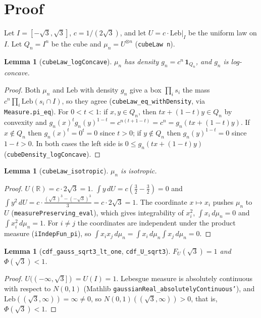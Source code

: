 \documentclass[11pt]{article}
\newtheorem{lemma}[theorem]{Lemma}
\theoremstyle{definition}
\newcommand{\R}{\mathbb{R}}
\begin{document}
\section{Proof}

Let $I=[-\sqrt3,\sqrt3]$, $c=1/(2\sqrt3)$, and let $U=c\cdot\mathrm{Leb}|_I$ be the uniform law on
$I$. Let $Q_n=I^n$ be the cube and $\mu_n=U^{\otimes n}$ (\texttt{cubeLaw n}).

\begin{lemma}[\texttt{cubeLaw\_logConcave}]
$\mu_n$ has density $g_n = c^n\,\mathbf 1_{Q_n}$, and $g_n$ is log-concave.
\end{lemma}
\begin{proof}
Both $\mu_n$ and $\mathrm{Leb}$ with density $g_n$ give a box $\prod_i s_i$ the mass
$c^n\prod_i \mathrm{Leb}(s_i\cap I)$, so they agree (\texttt{cubeLaw\_eq\_withDensity}, via
\texttt{Measure.pi\_eq}). For $0<t<1$: if $x,y\in Q_n$, then $tx+(1-t)y\in Q_n$ by convexity and
$g_n(x)^tg_n(y)^{1-t}=c^{n(t+1-t)}=c^n=g_n(tx+(1-t)y)$. If $x\notin Q_n$ then $g_n(x)^t=0^t=0$
since $t>0$; if $y\notin Q_n$ then $g_n(y)^{1-t}=0$ since $1-t>0$. In both cases the left side is
$0\le g_n(tx+(1-t)y)$ (\texttt{cubeDensity\_logConcave}).
\end{proof}

\begin{lemma}[\texttt{cubeLaw\_isotropic}]
$\mu_n$ is isotropic.
\end{lemma}
\begin{proof}
$U(\R)=c\cdot 2\sqrt3=1$. $\int y\,dU=c(\tfrac{3}{2}-\tfrac{3}{2})=0$ and
$\int y^2\,dU=c\cdot\frac{(\sqrt3)^3-(-\sqrt3)^3}{3}=c\cdot2\sqrt3=1$. The coordinate
$x\mapsto x_i$ pushes $\mu_n$ to $U$ (\texttt{measurePreserving\_eval}), which gives integrability
of $x_i^2$, $\int x_i\,d\mu_n=0$ and $\int x_i^2\,d\mu_n=1$. For $i\ne j$ the coordinates are
independent under the product measure (\texttt{iIndepFun\_pi}), so
$\int x_ix_j\,d\mu_n=\int x_i\,d\mu_n\int x_j\,d\mu_n=0$.
\end{proof}

\begin{lemma}[\texttt{cdf\_gauss\_sqrt3\_lt\_one}, \texttt{cdf\_U\_sqrt3}]
$F_U(\sqrt3)=1$ and $\Phi(\sqrt3)<1$.
\end{lemma}
\begin{proof}
$U(({-\infty},\sqrt3])=U(I)=1$. Lebesgue measure is absolutely continuous with respect to
$N(0,1)$ (Mathlib \texttt{gaussianReal\_absolutelyContinuous'}), and $\mathrm{Leb}((\sqrt3,\infty))=\infty\ne0$,
so $N(0,1)((\sqrt3,\infty))>0$, that is, $\Phi(\sqrt3)<1$.
\end{proof}
\end{document}
